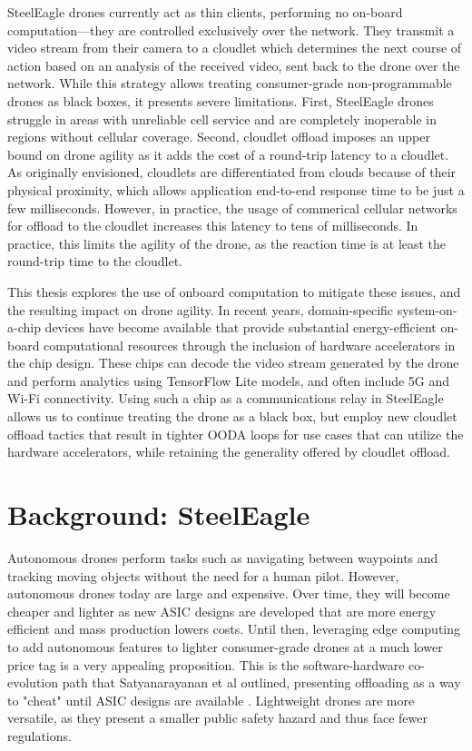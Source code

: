 SteelEagle drones currently act as thin clients, performing no on-board
computation---they are controlled exclusively over the network. They transmit a
video stream from their camera to a cloudlet which determines the next course
of action based on an analysis of the received video, sent back to the drone
over the network. While this strategy allows treating consumer-grade
non-programmable drones as black boxes, it presents severe limitations. First,
SteelEagle drones struggle in areas with unreliable cell service and are
completely inoperable in regions without cellular coverage. Second, cloudlet
offload imposes an upper bound on drone agility as it adds the cost of a
round-trip latency to a cloudlet. As originally envisioned, cloudlets are
differentiated from clouds because of their physical proximity, which allows
application end-to-end response time to be just a few milliseconds. However, in
practice, the usage of commerical cellular networks for offload to the cloudlet
increases this latency to tens of milliseconds. In practice, this limits the
agility of the drone, as the reaction time is at least the round-trip time to
the cloudlet.

This thesis explores the use of onboard computation to mitigate these issues,
and the resulting impact on drone agility. In recent years, domain-specific
system-on-a-chip devices have become available that provide substantial
energy-efficient on-board computational resources through the inclusion of
hardware accelerators in the chip design. These chips can decode the video
stream generated by the drone and perform analytics using TensorFlow Lite
models, and often include 5G and Wi-Fi connectivity. Using such a chip as a
communications relay in SteelEagle allows us to continue treating the drone as
a black box, but employ new cloudlet offload tactics that result in tighter
OODA loops for use cases that can utilize the hardware accelerators, while
retaining the generality offered by cloudlet offload.

\section{Background: SteelEagle}

Autonomous drones perform tasks such as navigating between waypoints and
tracking moving objects without the need for a human pilot.  However,
autonomous drones today are large and expensive. Over time, they will become
cheaper and lighter as new ASIC designs are developed that are more energy
efficient and mass production lowers costs. Until then, leveraging edge
computing to add autonomous features to lighter consumer-grade drones at a much
lower price tag is a very appealing proposition. This is the software-hardware
co-evolution path that Satyanarayanan et al outlined, presenting offloading as
a way to "cheat" until ASIC designs are available \cite{satya21}. Lightweight
drones are more versatile, as they present a smaller public safety hazard and
thus face fewer regulations.

